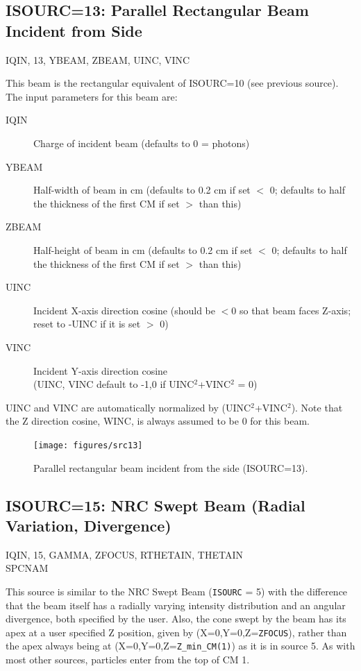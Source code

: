 \documentclass[12pt,twoside]{article}
\newcommand{\cen}[1]{\begin{center} #1 \end{center}                   }
\begin{document}
\subsection{ISOURC=13: Parallel Rectangular Beam Incident from Side}
\cen{IQIN, 13, YBEAM, ZBEAM, UINC, VINC}
 
This beam is the rectangular equivalent of ISOURC=10 (see previous
source).
The input parameters for this beam are:
\begin{description}
\item [IQIN] Charge of incident beam (defaults to 0 = photons)
\item [YBEAM] Half-width of beam in cm (defaults to 0.2 cm if set $<$ 0;
defaults to half the thickness of the first CM if set $>$ than this)
\item [ZBEAM] Half-height of beam in cm (defaults to 0.2 cm if set $<$ 0;
defaults to half the thickness of the first CM if set $>$ than this)
\item [UINC] Incident X-axis direction cosine (should be $<$0 so that beam
faces Z-axis; reset to -UINC if it is set $>$ 0)
\item [VINC] Incident Y-axis direction cosine \\
(UINC, VINC default to -1,0 if UINC$^2$+VINC$^2$ = 0)
\end{description}
UINC and VINC are automatically normalized by (UINC$^2$+VINC$^2$).  Note
that the Z direction cosine, WINC, is always assumed to be 0 for this
beam.
\begin{figure}[htbp]
\begin{center}
\leavevmode
\mbox{}\hspace{0cm}
\texttt{[image: figures/src13]}
\caption[ISOURC=13: Rectangular beam for XTUBE.]
{Parallel rectangular beam incident from the side (ISOURC=13).}
\label{fig_src13}
\end{center}
\end{figure}

\clearpage
\subsection{ISOURC=15: NRC Swept Beam (Radial Variation,
Divergence)}
\cen{IQIN, 15, GAMMA, ZFOCUS, RTHETAIN, THETAIN \\ SPCNAM}
This source is similar to the NRC Swept Beam ({\tt ISOURC} = 5) with the
difference that the beam itself has a radially varying intensity
distribution and an angular divergence, both specified by the user.  Also,
the cone swept by the beam has its apex at a user specified Z position,
given by (X=0,Y=0,Z={\tt ZFOCUS}), rather than the apex always being
at (X=0,Y=0,Z={\tt Z\_min\_CM(1)}) as it is in source 5.  As with most
other sources, particles enter from the top of CM 1.
\end{document}
